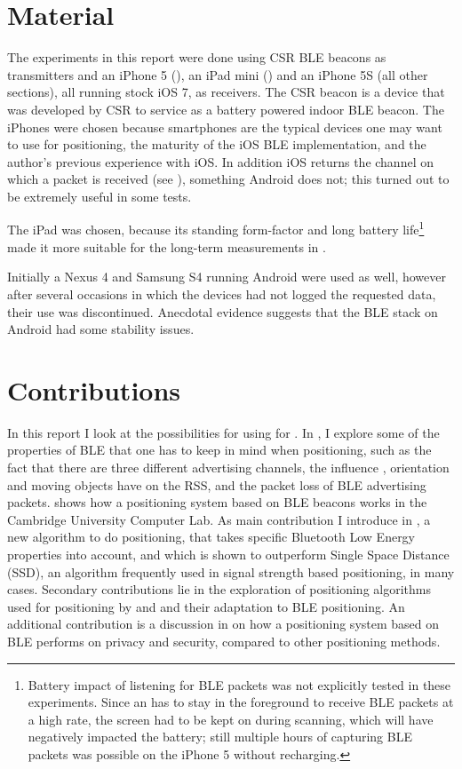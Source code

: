 \section{Material}
The experiments in this report were done using CSR BLE beacons as transmitters and an iPhone 5 (), an iPad mini () and an iPhone 5S (all other sections), all running stock iOS 7, as receivers.
The CSR beacon is a device that was developed by CSR to service as a battery powered indoor BLE beacon.
The iPhones were chosen because smartphones are the typical devices one may want to use for positioning, the maturity of the iOS BLE implementation, and the author's previous experience with iOS.
In addition iOS returns the channel on which a packet is received (see ), something Android does not; this turned out to be extremely useful in some tests.

The iPad was chosen, because its standing form-factor and long battery life\footnote{Battery impact of listening for BLE packets was not explicitly tested in these experiments. Since an \app has to stay in the foreground to receive BLE packets at a high rate, the screen had to be kept on during scanning, which will have negatively impacted the battery; still multiple hours of capturing BLE packets was possible on the iPhone 5 without recharging.} made it more suitable for the long-term measurements in .

Initially a Nexus 4 and Samsung S4 running Android were used as well, however after several occasions in which the devices had not logged the requested data, their use was discontinued.
Anecdotal evidence suggests that the BLE stack on Android had some stability issues.

\section{Contributions}

In this report I look at the possibilities for using \BLE for \ptfp.
In , I explore some of the properties of BLE that one has to keep in mind when positioning, such as the fact that there are three different advertising channels, the influence \mpi, orientation and moving objects have on the RSS, and the packet loss of BLE advertising packets.
 shows how a positioning system based on BLE beacons works in the Cambridge University Computer Lab.
As main contribution I introduce  in , a new algorithm to do positioning, that takes specific Bluetooth Low Energy properties into account, and which is shown to outperform Single Space Distance (SSD), an algorithm frequently used in signal strength based positioning, in many cases.
Secondary contributions lie in the exploration of positioning algorithms used for \wifi positioning by \citet{bahl2000radar} and \citet{king2006compass} and their adaptation to BLE positioning.
An additional contribution is a discussion in  on how a positioning system based on BLE performs on privacy and security, compared to other positioning methods.


